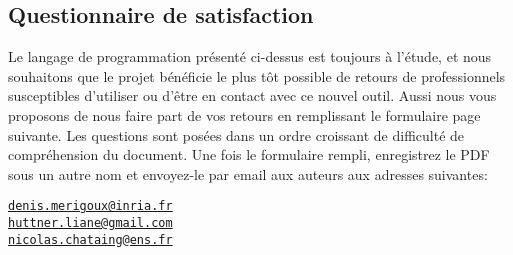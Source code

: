 \documentclass[12pt, french]{article}
\begin{document}
\subsection{Questionnaire de satisfaction}

Le langage de programmation présenté ci-dessus est toujours à l'étude, et nous souhaitons que le projet bénéficie le plus tôt possible de retours de professionnels susceptibles d'utiliser ou d'être en contact avec ce nouvel outil. Aussi nous vous proposons de nous faire part de vos retours en remplissant le formulaire page suivante. Les questions sont posées dans un ordre croissant de difficulté de compréhension du document. Une fois le formulaire rempli, enregistrez le PDF sous un autre nom et envoyez-le par email aux auteurs aux adresses suivantes:

\begin{center}
  \href{mailto:denis.merigoux@inria.fr}{\texttt{denis.merigoux@inria.fr}}\\[0.5em]
  \href{mailto:huttner.liane@gmail.com}{\texttt{huttner.liane@gmail.com}}\\[0.5em]
  \href{mailto:nicolas.chataing@ens.fr}{\texttt{nicolas.chataing@ens.fr}}
\end{center}

\clearpage
\end{document}
